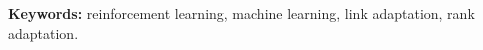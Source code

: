 \begin{resumo}

\vspace*{2ex}
\textbf{Keywords: } reinforcement learning, machine learning, link adaptation, rank adaptation.
\end{resumo}
